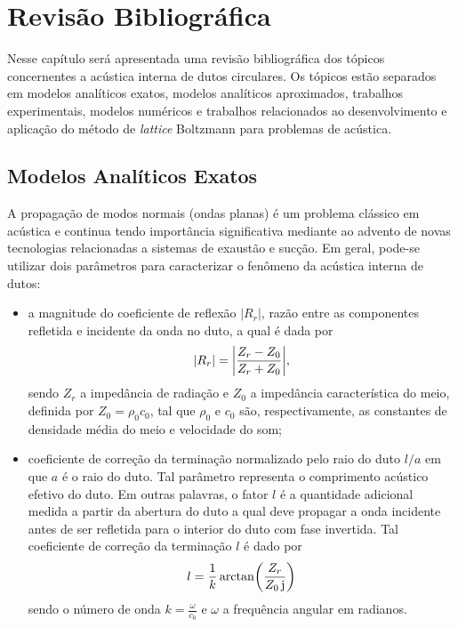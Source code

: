 \chapter{Revisão Bibliográfica}

Nesse capítulo será apresentada uma revisão bibliográfica dos tópicos concernentes a acústica interna de dutos circulares. Os tópicos estão separados em modelos analíticos exatos, modelos analíticos aproximados, trabalhos experimentais, modelos numéricos e trabalhos relacionados ao desenvolvimento e aplicação do método de \textit{lattice} Boltzmann para problemas de acústica.

\section{Modelos Analíticos Exatos} 

A propagação de modos normais (ondas planas) é um problema clássico em acústica e continua tendo importância significativa mediante ao advento de novas tecnologias relacionadas a sistemas de exaustão e sucção. Em geral, pode-se utilizar dois parâmetros para caracterizar o fenômeno da acústica interna de dutos:

\begin{itemize}
    \item a magnitude do coeficiente de reflexão $|R_{r}|$, razão entre as componentes refletida e incidente da onda no duto, a qual é dada por
    \begin{equation}
        |R_{r}|\simbolo{$R_{r}$}{Coeficiente de reflexão na terminação do duto} =\bigg|\frac{Z_{r} - Z_{0}}{Z_{r} + Z_{0}}\bigg|,
        \label{eq:R}
    \end{equation}
    sendo $Z_{r}$ a impedância de radiação e $Z_{0}$ a impedância característica do meio, definida por $Z_{0} = \rho_{0}c_{0}$, tal que $\rho_{0}$ e $c_{0}$ são, respectivamente, as constantes de densidade média do meio e velocidade do som;
    
    \item coeficiente de correção da terminação normalizado pelo raio do duto $l/a$ em que $a$ é o raio do duto. Tal parâmetro representa o comprimento acústico efetivo do duto. Em outras palavras, o fator $l$ é a quantidade adicional medida a partir da abertura do duto a qual deve propagar a onda incidente antes de ser refletida para o interior do duto com fase invertida. Tal coeficiente de correção da terminação $l$ é dado por
    \begin{equation}
        l = \frac{1}{k} \arctan\!\left(\frac{Z_{r}}{Z_{0} \, \mathrm{j}\simbolo{$j$}{Unidade imaginária}}\right)
        \label{eq:l}
    \end{equation}
    sendo o número de onda $k = \frac{\omega}{c_0}$ e $\omega$ a frequência angular em radianos.
\end{itemize}


